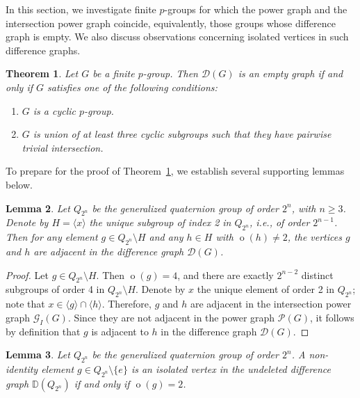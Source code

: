 \documentclass[12pt]{amsart}
\theoremstyle{plain}
\newtheorem{theorem}{Theorem}[section]
\newtheorem{lemma}[theorem]{Lemma}
\theoremstyle{remark}
\theoremstyle{definition}
\begin{document}
In this section, we investigate finite \(p\)-groups for which the power graph and the intersection power graph coincide, equivalently, those groups whose difference graph is empty. We also discuss observations concerning isolated vertices in such difference graphs.

\begin{theorem}\label{t:empty}
Let \(G\) be a finite \(p\)-group. Then \(\mathcal{D}(G)\) is an empty graph if and only if \(G\) satisfies one of the following conditions:
\begin{enumerate}
  \item \(G\) is a cyclic \(p\)-group.
  \item \(G\) is union of at least three cyclic subgroups such that they have pairwise trivial intersection.
    
\end{enumerate}
\end{theorem}

To prepare for the proof of Theorem~\ref{t:empty}, we establish several supporting lemmas below.

\begin{lemma}\label{t:gq}
Let \(Q_{2^n}\) be the generalized quaternion group of order \(2^n\), with \(n \ge 3\). Denote by \(H = \langle x \rangle\) the unique subgroup of index 2 in \(Q_{2^n}\), i.e., of order \(2^{n-1}\). Then for any element \(g \in Q_{2^n} \setminus H\) and any \(h \in H\) with \(\operatorname{o}(h) \neq 2\), the vertices \(g\) and \(h\) are adjacent in the difference graph \(\mathcal{D}(G)\).
\end{lemma}

\begin{proof}
Let \(g \in Q_{2^n} \setminus H\). Then \(\operatorname{o}(g) = 4\), and there are exactly \(2^{n-2}\) distinct subgroups of order 4 in \(Q_{2^n}\setminus H\). Denote by \(x\) the unique element of order 2 in \(Q_{2^n}\); note that \(x \in \langle g \rangle \cap \langle h \rangle\). Therefore, \(g\) and \(h\) are adjacent in the intersection power graph \(\mathcal{G}_I(G)\). Since they are not adjacent in the power graph \(\mathcal{P}(G)\), it follows by definition that \(g\) is adjacent to \(h\) in the difference graph \(\mathcal{D}(G)\).
\end{proof}


\begin{lemma}\label{t:gq_isol}
Let \(Q_{2^n}\) be the generalized quaternion group of order \(2^n\). A non-identity element
$g \in Q_{2^n} \setminus \{e\}$ is an isolated vertex in the undeleted difference graph \(\mathbb{D}(Q_{2^n})\) if and only if \(\operatorname{o}(g) = 2\).
\end{lemma}
\end{document}
